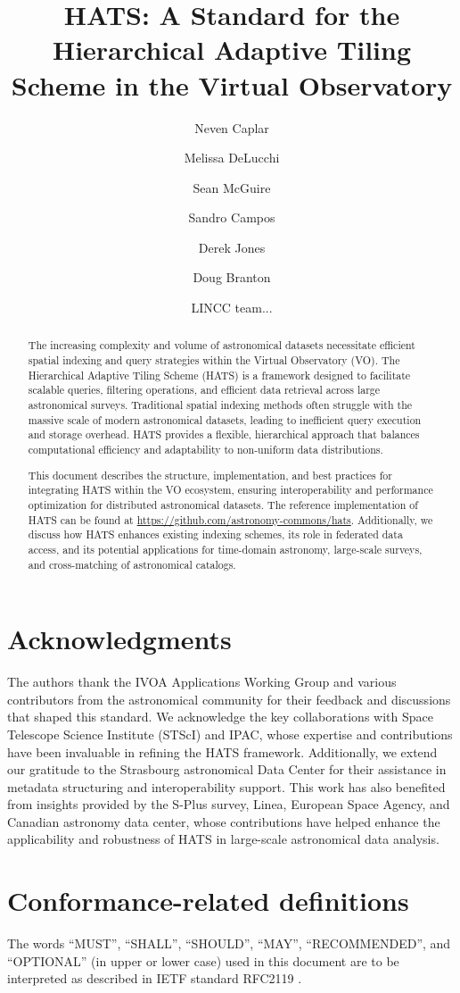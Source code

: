 \documentclass[11pt,a4paper]{ivoa}
\title{HATS: A Standard for the Hierarchical Adaptive Tiling Scheme in the Virtual Observatory}
\author[https://www.ivoa.net/authors/caplar]{Neven Caplar}
\author[https://www.ivoa.net/authors/usher]{Melissa DeLucchi}
\author[https://www.ivoa.net/authors/caplar]{Sean McGuire}
\author[https://www.ivoa.net/authors/usher]{Sandro Campos}
\author[https://www.ivoa.net/authors/caplar]{Derek Jones}
\author[https://www.ivoa.net/authors/usher]{Doug Branton}
\author[https://www.ivoa.net/authors/offline]{LINCC team...}
\begin{document}
\begin{abstract}
The increasing complexity and volume of astronomical datasets necessitate efficient spatial indexing and query strategies within the Virtual Observatory (VO). 
The Hierarchical Adaptive Tiling Scheme (HATS) is a framework designed to facilitate scalable queries, filtering operations, and efficient data retrieval across large astronomical surveys. 
Traditional spatial indexing methods often struggle with the massive scale of modern astronomical datasets, leading to inefficient query execution and storage overhead. 
HATS provides a flexible, hierarchical approach that balances computational efficiency and adaptability to non-uniform data distributions.

This document describes the structure, implementation, and best practices for integrating HATS within the VO ecosystem, ensuring interoperability and performance optimization for distributed astronomical datasets. 
The reference implementation of HATS can be found at \url{https://github.com/astronomy-commons/hats}. 
Additionally, we discuss how HATS enhances existing indexing schemes, its role in federated data access, and its potential applications for time-domain astronomy, large-scale surveys, and cross-matching of astronomical catalogs.
\end{abstract}

\section*{Acknowledgments}
The authors thank the IVOA Applications Working Group and various contributors from the astronomical community for their feedback and discussions that shaped this standard. 
We acknowledge the key collaborations with Space Telescope Science Institute (STScI) and IPAC, whose expertise and contributions have been invaluable in refining the HATS framework. 
Additionally, we extend our gratitude to  the Strasbourg astronomical Data Center for their assistance in metadata structuring and interoperability support. 
This work has also benefited from insights provided by the S-Plus survey, Linea, European Space Agency, and Canadian astronomy data center, whose contributions have helped enhance the applicability and robustness of HATS in large-scale astronomical data analysis.


\section*{Conformance-related definitions}
The words ``MUST'', ``SHALL'', ``SHOULD'', ``MAY'', ``RECOMMENDED'', and
``OPTIONAL'' (in upper or lower case) used in this document are to be
interpreted as described in IETF standard RFC2119 \citep{std:RFC2119}.
\end{document}
